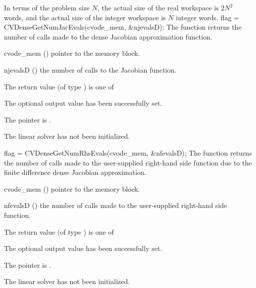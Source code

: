 {
  In terms of the problem size $N$, the actual size of the real workspace
  is $2N^2$  words, and the actual size of the integer workspace
  is $N$ integer words.
}
{
  flag = CVDenseGetNumJacEvals(cvode\_mem, \&njevalsD);
}
{
  The function  returns the
  number of calls made to the dense Jacobian approximation function.
}
{
  \begin{args}
  \item[cvode\_mem] ()
    pointer to the {\cvodes} memory block.
  \item[njevalsD] ()
    the number of calls to the Jacobian function.
  \end{args}
}
{
  The return value  (of type ) is one of
  \begin{args}
  \item[\Id{CVDENSE\_SUCCESS}] 
    The optional output value has been successfully set.
  \item[\Id{CVDENSE\_MEM\_NULL}]
    The  pointer is .
  \item[\Id{CVDENSE\_LMEM\_NULL}]
    The {\cvdense} linear solver has not been initialized.
  \end{args}
}
{}
{
  flag = CVDenseGetNumRhsEvals(cvode\_mem, \&nfevalsD);
}
{
  The function  returns the
  number of calls made to the user-supplied right-hand side function due to the 
  finite difference dense Jacobian approximation.
}
{
  \begin{args}
  \item[cvode\_mem] ()
    pointer to the {\cvodes} memory block.
  \item[nfevalsD] ()
    the number of calls made to the user-supplied right-hand side function.
  \end{args}
}
{
  The return value  (of type ) is one of
  \begin{args}
  \item[\Id{CVDENSE\_SUCCESS}] 
    The optional output value has been successfully set.
  \item[\Id{CVDENSE\_MEM\_NULL}]
    The  pointer is .
  \item[\Id{CVDENSE\_LMEM\_NULL}]
    The {\cvdense} linear solver has not been initialized.
  \end{args}
}
